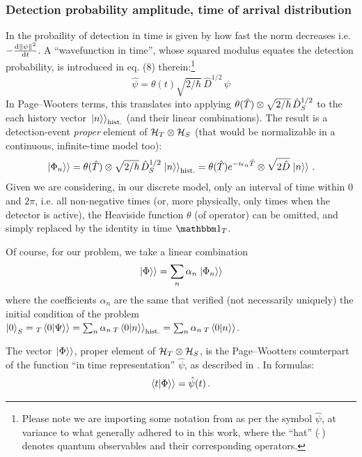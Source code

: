 \subsubsection{Detection probability amplitude, time of arrival distribution}

In \cite{RuschhauptAbsorption} the probaility of detection in time is given
by how fast the norm decreases i.e. $-\dv{\norm{\psi}^2}{t}$.
A ``wavefunction in time'', whose squared modulus equates the detection probability,
is introduced in eq. (8) therein:\footnote{
  Please note we are importing some notation from \cite{RuschhauptAbsorption} as per the symbol $\hat{\psi}$,
  at variance to what generally adhered to in this work,
  where the ``hat'' ($\hat{\;}$) denotes quantum observables and their corresponding operators.
}
\begin{equation}
  \hat{\psi} = \theta(t) \sqrt{2/\hbar}\,\hat{D}^{1/2}\,\psi
\end{equation}
In Page--Wooters terms, this translates into applying
$\theta(\hat{T}) \otimes \sqrt{2/\hbar}\,\hat{D}^{1/2}_S$
to the each history vector $\left.\left| n \right\rangle\right\rangle_{\text{hist.}}$
(and their linear combinations).
The result is a detection-event \emph{proper} element of ${\mathcal{H}_T \otimes \mathcal{H}_S}$
(that would be normalizable in a continuous, infinite-time model too):
\begin{equation}\label{eq:qubit_detection_wavefunction}
  \left.\left| \Phi_n \right\rangle\right\rangle =
    \theta(\hat{T}) \otimes \sqrt{2/\hbar}\,\hat{D}^{1/2}_S \left.\left| n \right\rangle\right\rangle_{\text{hist.}} =
    \theta(\hat{T}) e^{-i\epsilon_{n}\hat{T}} \otimes \sqrt{2\hat{D}} \left.\left| n \right\rangle\right\rangle \, \text{.}
\end{equation}
Given we are considering, in our discrete model, only an interval of time within $0$ and $2\pi$,
i.e. all non-negative times (or, more physically, only times when the detector is active),
the Heaviside function $\theta$ (of operator) can be omitted, and simply replaced
by the identity in time $\idop_T$.

Of course, for our problem, we take a linear combination
\begin{equation}
  \left.\left| \Phi \right\rangle\right\rangle = \sum_n \alpha_n \left.\left| \Phi_n \right\rangle\right\rangle
\end{equation}
where the coefficients $\alpha_n$ are the same that verified
(not necessarily uniquely)
the initial condition of the problem
$\ket{0}_S = {}_T\!\left.\left\langle 0 \middle| \Psi \right\rangle\right\rangle = \sum_n \alpha_n \, {}_T\!\left.\left\langle 0 \middle| n \right\rangle\right\rangle_{\text{hist.}} = \sum_n \alpha_n \, {}_T\!\left.\left\langle 0 \middle| n \right\rangle\right\rangle$.

\citereset
The vector $\left.\left| \Phi \right\rangle\right\rangle$, proper element of $\mathcal{H}_T \otimes \mathcal{H}_S$,
is the Page--Wootters counterpart of the function
``in time representation'' $\hat{\psi}$,
as
described in \cite{RuschhauptAbsorption}. In formulas:
\begin{equation}
  \!\left.\left\langle t \middle| \Phi \right\rangle\right\rangle = \hat{\psi}(t) \, \text{.}
\end{equation}

